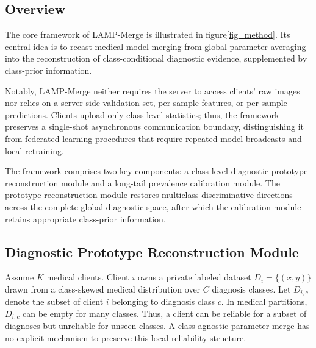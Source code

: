 \documentclass[letterpaper]{article} %
\begin{document}
\subsection{Overview}

The core framework of LAMP-Merge is illustrated in figure\ref{fig_method}. Its central idea is to recast medical model merging from global parameter averaging into the reconstruction of class-conditional diagnostic evidence, supplemented by class-prior information.

Notably, LAMP-Merge neither requires the server to access clients’ raw images nor relies on a server-side validation set, per-sample features, or per-sample predictions. Clients upload only class-level statistics; thus, the framework preserves a single-shot asynchronous communication boundary, distinguishing it from federated learning procedures that require repeated model broadcasts and local retraining.

The framework comprises two key components: a class-level diagnostic prototype reconstruction module and a long-tail prevalence calibration module. The prototype reconstruction module restores multiclass discriminative directions across the complete global diagnostic space, after which the calibration module retains appropriate class-prior information.

\subsection{Diagnostic Prototype Reconstruction Module}
Assume $K$ medical clients. Client $i$ owns a private labeled dataset $D_i=\{(x,y)\}$ drawn from a class-skewed medical distribution over $C$ diagnosis classes. Let $D_{i,c}$ denote the subset of client $i$ belonging to diagnosis class $c$. In medical partitions, $D_{i,c}$ can be empty for many classes. Thus, a client can be reliable for a subset of diagnoses but unreliable for unseen classes. A class-agnostic parameter merge has no explicit mechanism to preserve this local reliability structure.
\end{document}
